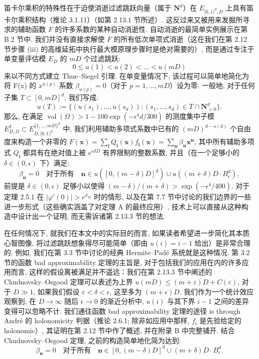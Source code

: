 笛卡尔乘积的特殊性在于迫使消逝过滤跳跃向量（属于 \(\mathbf{N}^d\)）在 \(E_{[0,1)^d,D}\) 上具有笛卡尔乘积结构（推论 3.1.11）（如第 2.13.1 节所述）. 这反过来又被用来发掘所寻求的辅助函数 \(F\) 的许多系数的某种自动消逝性. 自动消逝的最简单实例展示在第 B.2 节中. 我们并没有直接求解使 \(F\) 的所有低次单项式消逝（这在我们在第 2.12 节步骤 (iii) 的高维延拓中执行最大模原理步骤时是绝对需要的）, 而是通过专注于单变量评估模 \(E_D\) 的 \(mD\) 个过滤跳跃:
\[ 0 \le u(1) < u(2) < \dots < u(mD) \]
来以不同方式建立 Thue--Siegel 引理. 在单变量情况下, 该过程可以简单地简化为将 F(x) 的 \(x^{u(p)}\) 系数 \(\beta_{u(p)} = 0\)（对于 \(p = 1, \dots, mD\)）设为零. 一般地, 对于任何子集 \(T \subset [0, mD]^d\), 我们写成:
\[ u(T) := \{(u(s_1), \dots, u(s_d)) : (s_1, \dots, s_d) \in T \cap \mathbf{N}_{>0}^d\}. \]
那么, 在满足 \(\operatorname{vol}(\Omega) > 1 - 100 \exp\left(-\epsilon^4 d/300\right)\) 的测度集中子模 \(E_{D,\Omega}^I \subset E_{D,[0,1)^d}^{\{1,\dots,mD\}^d}\) 中, 我们利用辅助多项式系数中已有的 \((mD)^{d-o(d)}\) 个自由度来构造一个非零的 \(F(\mathbf{x}) = \sum_{\mathbf{i}} Q_{\mathbf{i}}(\mathbf{x}) f_{\mathbf{i}}(\mathbf{x}) = \sum_{\mathbf{n}} \beta_{\mathbf{n}} \mathbf{x}^{\mathbf{n}}\), 其中所有辅助多项式 \(Q_{\mathbf{i}}\) 都具有在绝对值上被 \(e^{\epsilon dD}\) 有界限制的整数系数, 并且（在一个足够小的 \(\delta \in (0,\epsilon)\) 下）满足:
\begin{equation}\label{eq:2.13.7}
\beta_{\mathbf{n}} = 0 \quad \text{对于所有} \quad \mathbf{n} \in u([0, (m-\delta)D]^d) \cup u((m+\delta)D \cdot B_{\epsilon}^d),
\end{equation}
前提是 \(\delta \in (0, \epsilon)\) 足够小以使得 \((m - \delta)/(m + \delta) > \exp(-\epsilon^4/400)\). 对于定理 2.5.1 在 \(\lvert\varphi'(0)\rvert > e^{\sigma_m}\) 时的情形, 以及在第 7.7 节中讨论的我们边界的一些进一步形式（这些确实涵盖了对定理 A 的最终应用）, 技术上可以直接从这种构造中设计出一个证明, 而无需诉诸第 2.13.3 节的想法.

在任何情况下, 就我们在本文中的实际目的而言, 如果读者希望进一步简化其本质心智图像, 将过滤跳跃想象得尽可能简单（即由 \(u(i) = i - 1\) 给出）是非常合理的. 例如, 我们在第 3.3 节中讨论的经典 Hermite--Pad{\'e} 系统就是这种情况. 第 3.2 节的函数 bad approximability 定理的主旨是, 对于包括我们的应用在内的许多应用而言, 这样的假设离被满足并不遥远：我们在第 2.13.3 节中阐述的 Chudnovsky--Osgood 定理可以表述为上界 \(u(mD) \le (m+\varepsilon)D + C(\varepsilon)\), 对于 \(D\gg 1\), 如果我们假设 \(\varepsilon<\delta<\epsilon\), 这至多为 \((m+\epsilon)D\). 我们作为一个统计效应观察到, 在 \(D\to\infty\) 随后 \(\epsilon\to 0\) 的渐近分析中, \(u(i)\) 与其下界 \(i-1\) 之间的差异变得可以忽略不计. 我们通往函数 bad approximability 定理的途径 is through Andr{\'e} 的 holonomicity 判据（推论 2.6.1; 除非如应用中那样, \(f_i\) 是先验给定的 holonomic）, 其证明在第 2.12 节中作了概述, 并在附录 B 中完整铺开. 结合 Chudnovsky--Osgood 定理, 之前的构造简单地化简为达到:
\begin{equation}\label{eq:2.13.8}
\beta_{\mathbf{n}} = 0 \quad \text{对于所有} \quad \mathbf{n} \in [0, (m - \delta)D]^d \cup (m + \delta)D \cdot B_{\epsilon}^d.
\end{equation}

